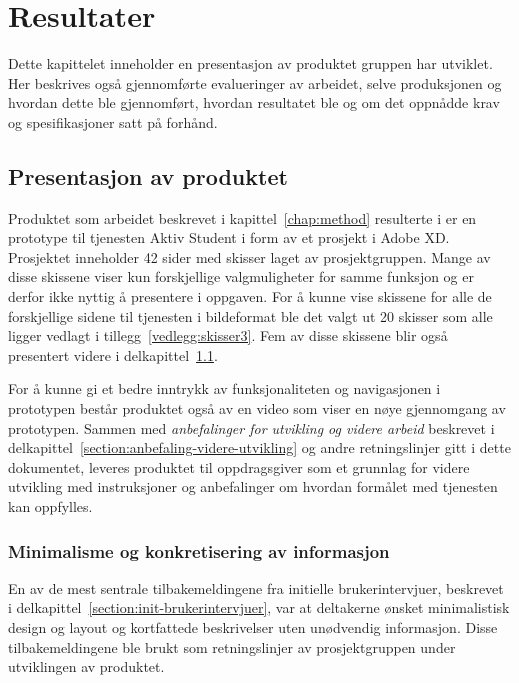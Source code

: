 \cleardoublepage
\chapter{Resultater}
\label{chap:results} 

Dette kapittelet inneholder en presentasjon av produktet gruppen har utviklet. Her beskrives også gjennomførte evalueringer av arbeidet, selve produksjonen og hvordan dette ble gjennomført, hvordan resultatet ble og om det oppnådde krav og spesifikasjoner satt på forhånd.

\section{Presentasjon av produktet}
\label{section:presentasjon-produkt}
Produktet som arbeidet beskrevet i kapittel~\ref{chap:method} resulterte i er en prototype til tjenesten Aktiv Student i form av et prosjekt i Adobe XD. Prosjektet inneholder 42 sider med skisser laget av prosjektgruppen. Mange av disse skissene viser kun forskjellige valgmuligheter for samme funksjon og er derfor ikke nyttig å presentere i oppgaven. For å kunne vise skissene for alle de forskjellige sidene til tjenesten i bildeformat ble det valgt ut 20 skisser som alle ligger vedlagt i tillegg~\ref{vedlegg:skisser3}. Fem av disse skissene blir også presentert videre i delkapittel~\ref{section:presentasjon-produkt}.

For å kunne gi et bedre inntrykk av funksjonaliteten og navigasjonen i prototypen består produktet også av en video som viser en nøye gjennomgang av prototypen. Sammen med {\em anbefalinger for utvikling og videre arbeid} beskrevet i delkapittel~\ref{section:anbefaling-videre-utvikling} og andre retningslinjer gitt i dette dokumentet, leveres produktet til oppdragsgiver som et grunnlag for videre utvikling med instruksjoner og anbefalinger om hvordan formålet med tjenesten kan oppfylles.

\subsection{Minimalisme og konkretisering av informasjon}
En av de mest sentrale tilbakemeldingene fra initielle brukerintervjuer, beskrevet i delkapittel~\ref{section:init-brukerintervjuer}, var at deltakerne ønsket minimalistisk design og layout og kortfattede beskrivelser uten unødvendig informasjon. Disse tilbakemeldingene ble brukt som retningslinjer av prosjektgruppen under utviklingen av produktet. 

